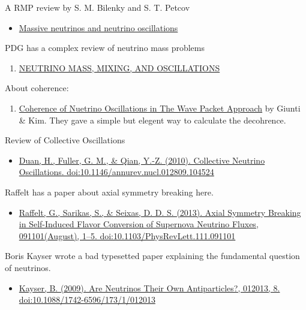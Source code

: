 \documentclass[letterpaper,12pt,english]{sphinxmanual}
\begin{document}
A RMP review by S. M. Bilenky and S. T. Petcov
\begin{itemize}
\item {} 
\href{http://journals.aps.org/rmp/abstract/10.1103/RevModPhys.59.671}{Massive neutrinos and neutrino oscillations}

\end{itemize}

PDG has a complex review of neutrino mass problems
\begin{enumerate}
\item {} 
\href{http://pdg.lbl.gov/2012/reviews/rpp2012-rev-neutrino-mixing.pdf}{NEUTRINO MASS, MIXING, AND OSCILLATIONS}

\end{enumerate}

About coherence:
\begin{enumerate}
\item {} 
\href{http://journals.aps.org/prd/abstract/10.1103/PhysRevD.58.017301}{Coherence of Nuetrino Oscillations in The Wave Packet Approach} by Giunti \& Kim. They gave a simple but elegent way to calculate the decohrence.

\end{enumerate}

Review of Collective Oscillations
\begin{itemize}
\item {} 
\href{http://arxiv.org/abs/1001.2799}{Duan, H., Fuller, G. M., \& Qian, Y.-Z. (2010). Collective Neutrino Oscillations. doi:10.1146/annurev.nucl.012809.104524}

\end{itemize}

Raffelt has a paper about axial symmetry breaking here.
\begin{itemize}
\item {} 
\href{http://arxiv.org/abs/1305.7140}{Raffelt, G., Sarikas, S., \& Seixas, D. D. S. (2013). Axial Symmetry Breaking in Self-Induced Flavor Conversion of Supernova Neutrino Fluxes, 091101(August), 1–5. doi:10.1103/PhysRevLett.111.091101}

\end{itemize}

Boris Kayser wrote a bad typesetted paper explaining the fundamental question of neutrinos.
\begin{itemize}
\item {} 
\href{http://arxiv.org/abs/0903.0899}{Kayser, B. (2009). Are Neutrinos Their Own Antiparticles?, 012013, 8. doi:10.1088/1742-6596/173/1/012013}

\end{itemize}
\end{document}

